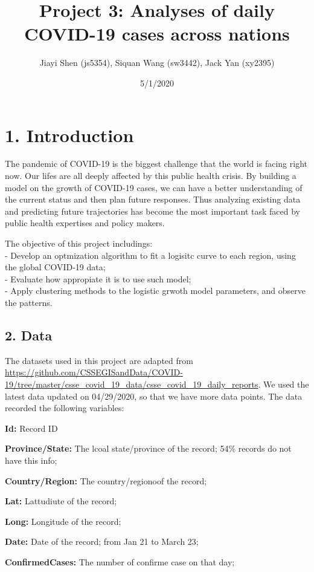 \documentclass[
]{article}
\title{Project 3: Analyses of daily COVID-19 cases across nations}
\author{Jiayi Shen (js5354), Siquan Wang (sw3442), Jack Yan (xy2395)}
\date{5/1/2020}
\begin{document}
\maketitle

\hypertarget{introduction}{%
\section{1. Introduction}\label{introduction}}

The pandemic of COVID-19 is the biggest challenge that the world is
facing right now. Our lifes are all deeply affected by this public
health crisis. By building a model on the growth of COVID-19 cases, we
can have a better understanding of the current status and then plan
future responses. Thus analyzing existing data and predicting future
trajectories has become the most important task faced by public health
expertises and policy makers.

The objective of this project includings:\\
- Develop an optmization algorithm to fit a logisitc curve to each
region, using the global COVID-19 data;\\
- Evaluate how appropiate it is to use such model;\\
- Apply clustering methods to the logistic grwoth model parameters, and
observe the patterns.

\hypertarget{data}{%
\subsection{2. Data}\label{data}}

The datasets used in this project are adapted from
\url{https://github.com/CSSEGISandData/COVID-19/tree/master/csse_covid_19_data/csse_covid_19_daily_reports}.
We used the latest data updated on 04/29/2020, so that we have more data
points. The data recorded the following variables:

\textbf{Id:} Record ID

\textbf{Province/State:} The lcoal state/province of the record; 54\%
records do not have this info;

\textbf{Country/Region:} The country/regionoof the record;

\textbf{Lat:} Lattudiute of the record;

\textbf{Long:} Longitude of the record;

\textbf{Date:} Date of the record; from Jan 21 to March 23;

\textbf{ConfirmedCases:} The number of confirme case on that day;
\end{document}
